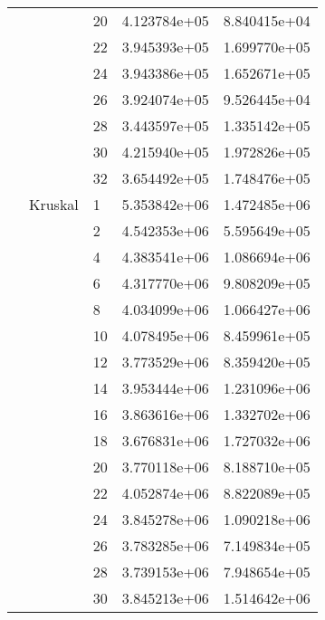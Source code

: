 \begin{tabular}{lllrr}
                      &            & 20 &  4.123784e+05 &  8.840415e+04 \\
                      &            & 22 &  3.945393e+05 &  1.699770e+05 \\
                      &            & 24 &  3.943386e+05 &  1.652671e+05 \\
                      &            & 26 &  3.924074e+05 &  9.526445e+04 \\
                      &            & 28 &  3.443597e+05 &  1.335142e+05 \\
                      &            & 30 &  4.215940e+05 &  1.972826e+05 \\
                      &            & 32 &  3.654492e+05 &  1.748476e+05 \\
                      & Kruskal & 1  &  5.353842e+06 &  1.472485e+06 \\
                      &            & 2  &  4.542353e+06 &  5.595649e+05 \\
                      &            & 4  &  4.383541e+06 &  1.086694e+06 \\
                      &            & 6  &  4.317770e+06 &  9.808209e+05 \\
                      &            & 8  &  4.034099e+06 &  1.066427e+06 \\
                      &            & 10 &  4.078495e+06 &  8.459961e+05 \\
                      &            & 12 &  3.773529e+06 &  8.359420e+05 \\
                      &            & 14 &  3.953444e+06 &  1.231096e+06 \\
                      &            & 16 &  3.863616e+06 &  1.332702e+06 \\
                      &            & 18 &  3.676831e+06 &  1.727032e+06 \\
                      &            & 20 &  3.770118e+06 &  8.188710e+05 \\
                      &            & 22 &  4.052874e+06 &  8.822089e+05 \\
                      &            & 24 &  3.845278e+06 &  1.090218e+06 \\
                      &            & 26 &  3.783285e+06 &  7.149834e+05 \\
                      &            & 28 &  3.739153e+06 &  7.948654e+05 \\
                      &            & 30 &  3.845213e+06 &  1.514642e+06 \\

\end{tabular}

